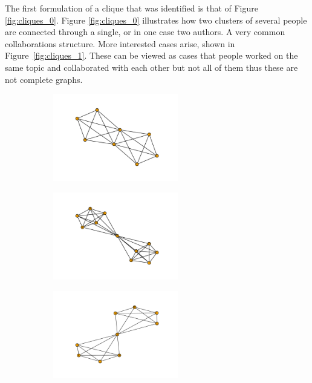 \documentclass{article}
\begin{document}
The first formulation of a clique that was identified is that of Figure
\ref{fig:cliques_0}. Figure \ref{fig:cliques_0} illustrates how
two clusters of several people are connected through a single, or in one case 
two authors. A very common collaborations structure. More interested cases 
arise, shown in Figure~\ref{fig:cliques_1}. These can be viewed as cases
that people worked on the same topic and collaborated with each other but not
all of them thus these are not complete graphs.

\begin{center}
\begin{figure}[!hbtp]
    \begin{subfigure}{0.6\textwidth}
        \includegraphics[width=0.6\textwidth]{./assets/images/coauthor00.pdf}
    \end{subfigure}
    \begin{subfigure}{0.6\textwidth}
        \includegraphics[width=0.6\textwidth]{./assets/images/coauthor04.pdf}
    \end{subfigure}
    \begin{subfigure}{0.6\textwidth}
        \includegraphics[width=0.6\textwidth]{./assets/images/coauthor06.pdf}

\end{subfigure}
\end{figure}
\end{center}
\end{document}
